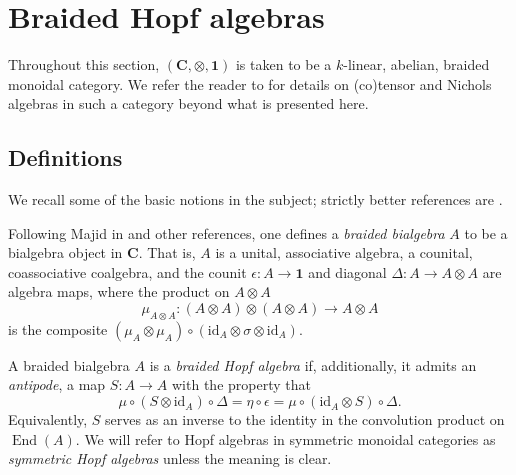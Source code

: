 \documentclass[12pt]{article}
\DeclareMathOperator{\End}{End}
\newcommand{\bC} {\mathbf{C}}
\newcommand{\one} {\mathbf{1}}
\newcommand{\id}{\mbox{id}}
\newcommand{\beqn}{\begin{equation}}
\newcommand{\eeqn}{\end{equation}}
\theoremstyle{plain}
\theoremstyle{definition}
\theoremstyle{remark}
\begin{document}
\section{Braided Hopf algebras} \label{br_Hopf_sec}

Throughout this section, $(\bC, \otimes, \one)$ is taken to be a $k$-linear, abelian, braided monoidal category.  We refer the reader to \cite{schauenburg, meir} for details on (co)tensor and Nichols algebras in such a category beyond what is presented here.

\subsection{Definitions} 

We recall some of the basic notions in the subject; strictly better references are \cite{montgomery, cartier, andruskiewitsch-schneider}.

Following Majid in \cite{majid_braided} and other references, one defines a \emph{braided bialgebra} $A$ to be a bialgebra object in $\bC$.  That is, $A$ is a unital, associative algebra, a counital, coassociative coalgebra, and the counit $\epsilon:A \to \one$ and diagonal $\Delta: A \to A \otimes A$ are algebra maps, where the product on $A \otimes A$ 
%
$$\mu_{A \otimes A}: (A \otimes A) \otimes (A \otimes A) \to A \otimes A$$
%
is the composite $(\mu_A \otimes \mu_A) \circ (\id_A \otimes \sigma \otimes \id_A)$.

A braided bialgebra $A$ is a \emph{braided Hopf algebra} if, additionally, it admits an \emph{antipode}, a map $S: A \to A$ with the property that
%
\beqn \label{antipode_eqn} \mu \circ (S \otimes \id_A) \circ \Delta = \eta \circ \epsilon = \mu \circ (\id_A \otimes S) \circ \Delta. \eeqn
%
Equivalently, $S$ serves as an inverse to the identity in the convolution product on $\End(A)$.  We will refer to  Hopf algebras in symmetric monoidal categories as \emph{symmetric Hopf algebras} unless the meaning is clear.
\end{document}
